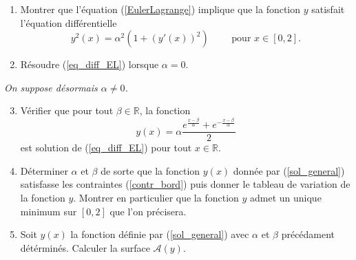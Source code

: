 \begin{exo}
    \begin{enumerate}
        \item Montrer que l'équation (\ref{EulerLagrange}) implique que la fonction $y$ satisfait l'équation différentielle
        \begin{equation}
                y^{2}(x) = \alpha^{2}(1+(y'(x))^{2})
                    \qquad \text{ pour } x \in [0,2]. \label{eq_diff_EL}
        \end{equation}
        \item Résoudre (\ref{eq_diff_EL}) lorsque $\alpha=0$.
    \end{enumerate}
    \begin{center}
        \textit{On suppose désormais $\alpha \neq 0$.}
    \end{center}
    \begin{enumerate}\setcounter{enumi}{2}
        \item Vérifier que pour tout $\beta \in \mathbb{R}$, la fonction
            \begin{equation}
                y(x) = \alpha \frac{e^{\frac{x-\beta}{\alpha}} + e^{-\frac{x-\beta}{\alpha}}}{2} \label{sol_general}
            \end{equation}
        est solution de (\ref{eq_diff_EL}) pour tout $x \in \mathbb{R}$.
        \item Déterminer $\alpha$ et $\beta$ de sorte que la fonction $y(x)$ donnée par (\ref{sol_general}) satisfasse les contraintes (\ref{contr_bord}) puis donner le tableau de variation de la fonction $y$. Montrer en particulier que la fonction $y$ admet un unique minimum sur $[0,2]$ que l'on précisera.
        \item Soit $y(x)$ la fonction définie par (\ref{sol_general}) avec $\alpha$ et $\beta$ précédament détérminés. Calculer la surface $\mathcal{A}(y)$.
    \end{enumerate}
\end{exo}

